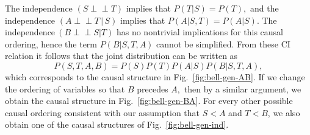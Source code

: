 \documentclass[12pt,onecolumn,nofootinbib]{revtex4-2}
\def\indep{\perp\!\!\!\!\perp}
\begin{document}
The independence $\left( S\indep T\right) $ implies that $P(T|S)=P(T),$ and
the independence $\left( A\indep T\,|\,S\right) $ implies that $P(A|S,T)=P(A|S)$.
The independence$\ \left( B\indep S|T\right) $ has no nontrivial implications
for this causal ordering, hence the term $P(B|S,T,A)$ cannot be simplified. From these CI relation it
follows that the joint distribution can be written as
\begin{equation*}
P(S,T,A,B)=P(S)P(T)P(A|S)P(B|S,T,A),
\end{equation*}%
which corresponds to the causal structure in Fig.~\ref{fig:bell-gen-AB}. If we change the
ordering of variables so that $B$ precedes $A,$ then by a similar argument,
we obtain the causal structure in Fig.~\ref{fig:bell-gen-BA}.  For every other possible causal ordering consistent with our assumption that $S<A$ and $T<B$, we also obtain one of the causal structures of Fig.~\ref{fig:bell-gen-ind}.
\end{document}
